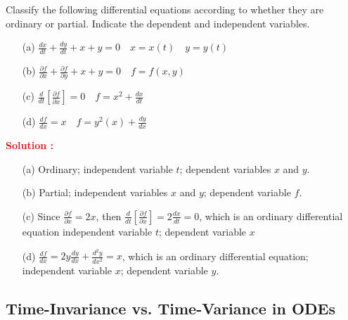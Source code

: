 \documentclass[12pt]{article}
\begin{document}
Classify the following differential equations according to whether they are ordinary or partial. Indicate the dependent and independent variables.
\begin{itemize}
    \item[(a)] \(\frac{dx}{dt} + \frac{dy}{dt} + x + y = 0 \quad x = x(t) \quad y = y(t)\)
    \item[(b)] \(\frac{\partial f}{\partial x} + \frac{\partial f}{\partial y} + x + y = 0 \quad f = f(x,y) \)
    \item[(c)] \( \frac{d}{dt}\left[ \frac{\partial f}{\partial x} \right] = 0 \quad f = x^2 + \frac{dx}{dt}\)
    \item[(d)] \(\frac{df}{dx} = x \quad f = y^2(x) + \frac{dy}{dx}\)
\end{itemize}
\textbf{\textcolor{red}{Solution :}} \\
\begin{itemize}
    \item[(a)] Ordinary; independent variable \(t\); dependent variables \(x\) and \(y\).
    \item[(b)] Partial; independent variables \(x\) and \(y\); dependent variable \(f\).
    \item[(c)] Since \(\frac{\partial f}{\partial x} = 2x\), then \(\frac{d}{dt}\left[ \frac{\partial f}{\partial x} \right] = 2\frac{dx}{dt} = 0\), which is an ordinary differential equation independent variable \(t\); dependent variable \(x\)
    \item[(d)] \(\frac{df}{dx} = 2y \frac{dy}{dx} + \frac{d^2y}{dx^2} =  x\), which is an ordinary differential equation; independent variable \(x\); dependent variable \(y\).
\end{itemize}

\clearpage
\subsection{Time-Invariance vs. Time-Variance in ODEs}
\end{document}
